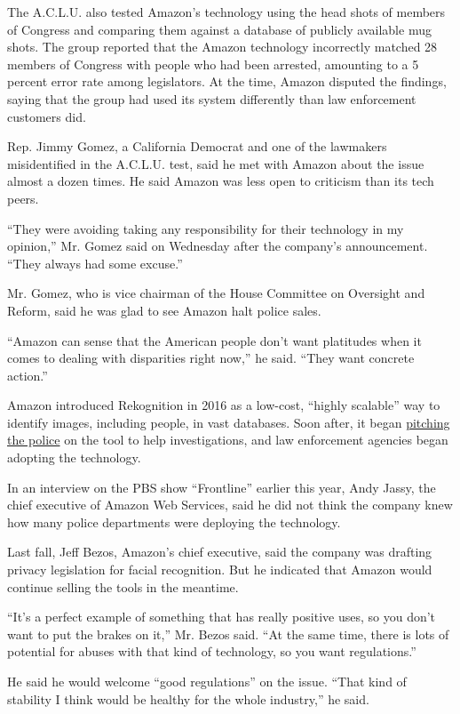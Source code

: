 The A.C.L.U. also tested Amazon's technology using the head shots of
members of Congress and comparing them against a database of publicly
available mug shots. The group reported that the Amazon technology
incorrectly matched 28 members of Congress with people who had been
arrested, amounting to a 5 percent error rate among legislators. At the
time, Amazon disputed the findings, saying that the group had used its
system differently than law enforcement customers did.

Rep. Jimmy Gomez, a California Democrat and one of the lawmakers
misidentified in the A.C.L.U. test, said he met with Amazon about the
issue almost a dozen times. He said Amazon was less open to criticism
than its tech peers.

``They were avoiding taking any responsibility for their technology in
my opinion,'' Mr. Gomez said on Wednesday after the company's
announcement. ``They always had some excuse.''

Mr. Gomez, who is vice chairman of the House Committee on Oversight and
Reform, said he was glad to see Amazon halt police sales.

``Amazon can sense that the American people don't want platitudes when
it comes to dealing with disparities right now,'' he said. ``They want
concrete action.''

Amazon introduced Rekognition in 2016 as a low-cost, ``highly scalable''
way to identify images, including people, in vast databases. Soon after,
it began
\href{https://www.nytimes3xbfgragh.onion/2018/05/22/technology/amazon-facial-recognition.html}{pitching
the police} on the tool to help investigations, and law enforcement
agencies began adopting the technology.

In an interview on the PBS show ``Frontline'' earlier this year, Andy
Jassy, the chief executive of Amazon Web Services, said he did not think
the company knew how many police departments were deploying the
technology.

Last fall, Jeff Bezos, Amazon's chief executive, said the company was
drafting privacy legislation for facial recognition. But he indicated
that Amazon would continue selling the tools in the meantime.

``It's a perfect example of something that has really positive uses, so
you don't want to put the brakes on it,'' Mr. Bezos said. ``At the same
time, there is lots of potential for abuses with that kind of
technology, so you want regulations.''

He said he would welcome ``good regulations'' on the issue. ``That kind
of stability I think would be healthy for the whole industry,'' he said.

